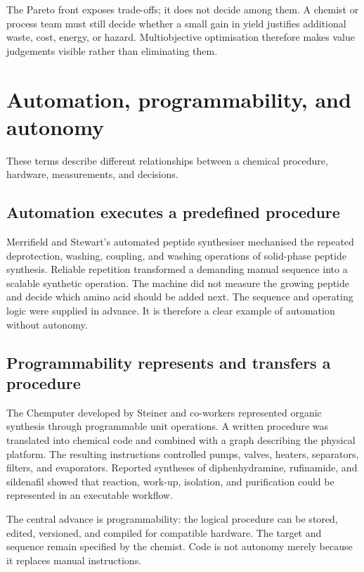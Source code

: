 The Pareto front exposes trade-offs; it does not decide among them.
A chemist or process team must still decide whether a small gain in yield justifies additional waste, cost, energy, or hazard.
Multiobjective optimisation therefore makes value judgements visible rather than eliminating them.

\section{Automation, programmability, and autonomy}

These terms describe different relationships between a chemical procedure, hardware, measurements, and decisions.

\subsection{Automation executes a predefined procedure}

Merrifield and Stewart's automated peptide synthesiser mechanised the repeated deprotection, washing, coupling, and washing operations of solid-phase peptide synthesis.
Reliable repetition transformed a demanding manual sequence into a scalable synthetic operation.
The machine did not measure the growing peptide and decide which amino acid should be added next.
The sequence and operating logic were supplied in advance.
It is therefore a clear example of automation without autonomy.

\subsection{Programmability represents and transfers a procedure}

The Chemputer developed by Steiner and co-workers represented organic synthesis through programmable unit operations.
A written procedure was translated into chemical code and combined with a graph describing the physical platform.
The resulting instructions controlled pumps, valves, heaters, separators, filters, and evaporators.
Reported syntheses of diphenhydramine, rufinamide, and sildenafil showed that reaction, work-up, isolation, and purification could be represented in an executable workflow.

The central advance is programmability: the logical procedure can be stored, edited, versioned, and compiled for compatible hardware.
The target and sequence remain specified by the chemist.
Code is not autonomy merely because it replaces manual instructions.

